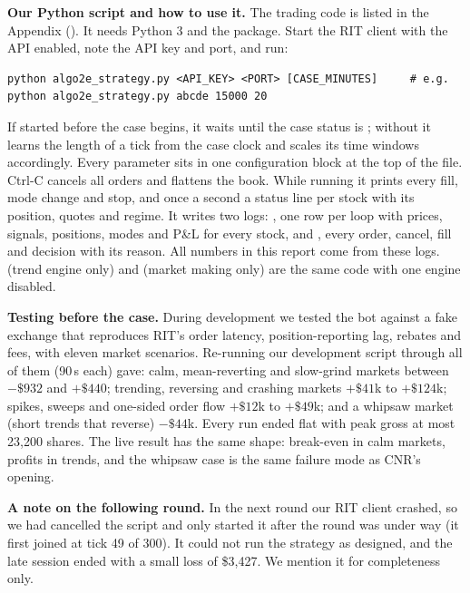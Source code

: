 \textbf{Our Python script and how to use it.} The trading code is listed in the Appendix (). It needs Python 3 and the  package. Start the RIT
client with the API enabled, note the API key and port, and run:
\begin{lstlisting}[basicstyle=\ttfamily\footnotesize, frame=single, columns=fullflexible, breaklines=true]
python algo2e_strategy.py <API_KEY> <PORT> [CASE_MINUTES]     # e.g. python algo2e_strategy.py abcde 15000 20
\end{lstlisting}
If started before the case begins, it waits until the case status is ; without  it learns the length of a tick from the case clock and scales its time windows
accordingly. Every parameter sits in one configuration block at the top of the file. Ctrl-C cancels all orders and flattens the book. While running it prints every fill, mode change and stop,
and once a second a status line per stock with its position, quotes and regime. It writes two logs: , one row per loop with prices, signals, positions, modes and P\&L
for every stock, and , every order, cancel, fill and decision with its reason. All numbers in this report come from these logs.
 (trend engine only) and  (market making only) are the same code with one engine disabled.

\textbf{Testing before the case.} During development we tested the bot against a fake exchange that reproduces RIT's order latency, position-reporting lag, rebates and fees, with eleven market scenarios. Re-running our development
script through all of them (90\,s each) gave: calm, mean-reverting and slow-grind markets between $-\$932$ and $+\$440$; trending, reversing and crashing markets $+\$41$k to $+\$124$k; spikes, sweeps
and one-sided order flow $+\$12$k to $+\$49$k; and a whipsaw market (short trends that reverse) $-\$44$k. Every run ended flat with peak gross at most 23{,}200 shares. The live result has the same
shape: break-even in calm markets, profits in trends, and the whipsaw case is the same failure mode as CNR's opening.

\textbf{A note on the following round.} In the next round our RIT client crashed, so we had cancelled the script and only started it after the round was under way (it first joined at tick 49 of 300).
It could not run the strategy as designed, and the late session ended with a small loss of \$3{,}427. We mention it for completeness only.

